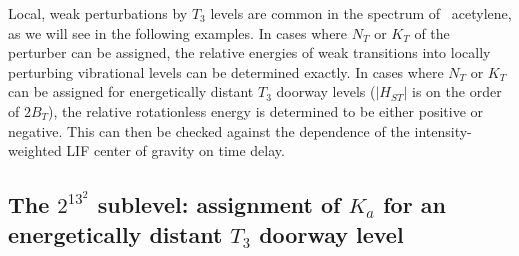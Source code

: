 
Local, weak perturbations by $T_3$ levels are common in the spectrum
of \astate\ acetylene, as we will see in the following examples.  In
cases where $N_T$ or $K_T$ of the perturber can be assigned, the
relative energies of weak transitions into locally perturbing
vibrational levels can be determined exactly.  In cases where $N_T$ or
$K_T$ can be assigned for energetically distant $T_3$ doorway levels
($\lvert H_{ST} \rvert$ is on the order of $2B_T$), the relative
rotationless energy is determined to be either positive or negative.
This can then be checked against the dependence of the
intensity-weighted LIF center of gravity on time delay.

\subsection{The $2^13^2$  sublevel: assignment of $K_a$ for an
  energetically distant $T_3$ doorway level}



